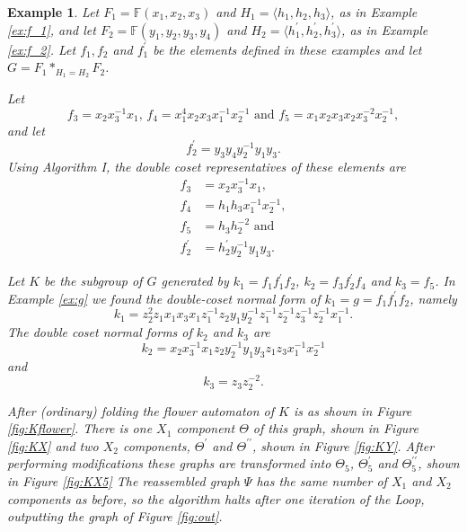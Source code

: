 \documentclass[a4paper,12pt]{article}
\newtheorem{exam}[theorem]{Example}
\newenvironment{example}{\begin{exam} \rm}{\end{exam}}
\numberwithin{equation}{section}
\numberwithin{figure}{section}
\newcommand{\FF}{\ensuremath{\mathbb{F}}}
\newcommand{\la}{\langle}
\newcommand{\ra}{\rangle}
\begin{document}
\begin{example}\label{ex:K}
Let $F_1=\FF(x_1,x_2,x_3)$ and $H_1=\la h_1,h_2,h_3\ra$, 
as in Example \ref{ex:f_1}, and let $F_2=\FF(y_1,y_2,y_3,y_4)$ and 
$H_2=\la h_1^\prime, h_2^\prime, h_3^\prime\ra$, as in Example \ref{ex:f_2}.
Let $f_1,f_2$ and $f_1^\prime$ be the elements defined in these examples
 and let $G=F_1\ast_{H_1=H_2} F_2$.  

Let  
\[f_3=x_2x_3^{-1}x_1,\, f_4= x_1^4 x_2 x_3 x_1^{-1} x_2^{-1} 
\textrm{ and } f_5=x_1x_2x_3x_2x_3^{-2}x_2^{-1},\]  
and let 
\[ f_2^\prime =y_3y_4y_2^{-1}y_1y_3.\]
Using Algorithm I, the double coset representatives of these elements are
\begin{align*}
f_3 & = x_2x_3^{-1}x_1,\\
f_4 &= h_1h_3 x_1^{-1}x_2^{-1},\\
f_5 &= h_3h_2^{-2}\textrm{ and }\\
f_2^\prime &= h_2^\prime y_2^{-1}y_1y_3.
\end{align*} 

Let $K$ be the subgroup of $G$ generated by $k_1=f_1f_1^\prime f_2$, 
$k_2= f_3f_2^\prime f_4$ and $k_3=f_5$. 
In Example \ref{ex:g} we found the double-coset normal form of
$k_1=g=f_1f_1^\prime f_2$, namely
\[k_1=z_2^2 z_1  x_1 x_3 x_1 z_1^{-1} 
z_2y_1y_2^{-1} z_1^{-1}z_2^{-1}
z_3^{-1}z_2^{-1} x_1^{-1}.\]
The double coset normal forms of $k_2$ and $k_3$ are 
\[k_2=  x_2x_3^{-1}x_1  z_2 y_2^{-1}y_1y_3 z_1z_3 x_1^{-1}x_2^{-1}\]
and 
\[k_3 = z_3z_2^{-2}.\]

After (ordinary) folding the flower automaton of $K$ is as shown in Figure \ref{fig:Kflower}.
There is one $X_1$ component $\Theta$ of this graph, shown in Figure \ref{fig:KX} 
and two $X_2$ components, $\Theta^\prime$ and $\Theta^{\prime\prime}$, shown in Figure \ref{fig:KY}. After performing modifications these  graphs are transformed into
 $\Theta_5$, $\Theta_5^{\prime}$ and $\Theta_5^{\prime\prime}$, shown in Figure \ref{fig:KX5}
The reassembled graph $\Psi$ has the same number of $X_1$ and $X_2$ components as before, so 
the algorithm halts after one iteration of the Loop, outputting the graph of Figure 
\ref{fig:out}. 
\end{example}
\end{document}
